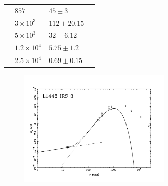 \documentclass[9pt]{extarticle}   	%
\begin{document}
\begin{table}
\begin{center}
\begin{tabular}{llll}
 & $857$ & $45\pm3$ & \citet{1998ApJ...509..733B}\\
 & $3\times10^{3}$ & $112\pm20.15$ & \citet{1998ApJ...509..733B}\\
 & $5\times10^{3}$ & $32\pm6.12$ & \citet{1998ApJ...509..733B}\\
 & $1.2\times10^{4}$ & $5.75\pm1.2$ & \citet{1998ApJ...509..733B}\\
 & $2.5\times10^{4}$ & $0.69\pm0.15$ & \citet{1998ApJ...509..733B}\\
\end{tabular}
\end{center}
\label{default}
\end{table}%

\begin{figure}[h!]
\begin{center}
\includegraphics[width=0.65\textwidth]{plots/L1448.pdf}
\label{default}
\end{center}
\end{figure}

\clearpage
\end{document}

